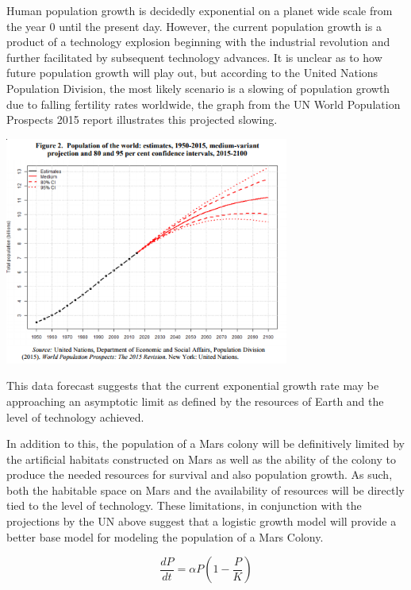 \documentclass[12pt]{article}
\begin{document}
Human population growth is decidedly exponential on a planet wide scale from the year 0 until the present day\cite{un}\cite{hyde}\cite{braben}. However, the current population growth is a product of a technology explosion beginning with the industrial revolution and further facilitated by subsequent technology advances\cite{cc}. It is unclear as to how future population growth will play out, but according to the United Nations Population Division, the most likely scenario is a slowing of population growth due to falling fertility rates worldwide, the graph from the UN World Population Prospects 2015 report\cite{un} illustrates this projected slowing.


\begin{minipage}{\textwidth}
		\centering
		\includegraphics[width=0.7\textwidth]{unPredPop}
\end{minipage}\hfill


This data forecast suggests that the current exponential growth rate may be approaching an asymptotic limit as defined by the resources of Earth and the level of technology achieved.


In addition to this, the population of a Mars colony will be definitively limited by the artificial habitats constructed on Mars\cite{nasa}\cite{spacex} as well as the ability of the colony to produce the needed resources for survival and also population growth. As such, both the habitable space on Mars and the availability of resources will be directly tied to the level of technology. These limitations, in conjunction with the projections by the UN above suggest that a logistic growth model will provide a better base model for modeling the population of a Mars Colony.


\begin{equation} \frac{dP}{dt} = \alpha P(1-\frac{P}{K}) \end{equation}
\end{document}
